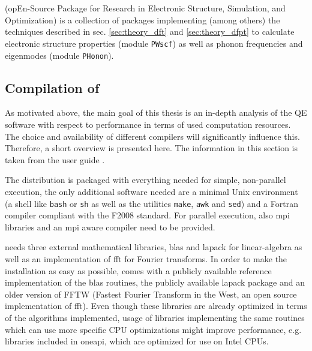 \documentclass[main.tex]{subfiles}
\begin{document}
\section{\QE}\label{sec:qe}

\QE (opEn-Source Package for Research in Electronic Structure, Simulation, and Optimization) \cite{giannozzi_quantum_2009,giannozzi_advanced_2017} is a collection of packages implementing (among others) the techniques described in sec. \ref{sec:theory_dft} and \ref{sec:theory_dfpt} to calculate electronic structure properties (module \texttt{PWscf}) as well as phonon frequencies and eigenmodes (module \texttt{PHonon}).

\subsection{Compilation of \QE}\label{sub:qe_compilation}

As motivated above, the main goal of this thesis is an in-depth analysis of the QE software with respect to performance in terms of used computation resources.
The choice and availability of different compilers will significantly influence this.
Therefore, a short overview is presented here.
The information in this section is taken from the  user guide \cite{noauthor_quantum_nodate}.

The \QE distribution is packaged with everything needed for simple, non-parallel execution, the only additional software needed are a minimal Unix environment (a shell like \texttt{bash} or \texttt{sh} as well as the utilities \texttt{make}, \texttt{awk} and \texttt{sed}) and a Fortran compiler compliant with the F2008 standard.
For parallel execution, also \gls{mpi} libraries and an \gls{mpi} aware compiler need to be provided.

\QE needs three external mathematical libraries, \gls{blas} and \gls{lapack} for linear-algebra as well as an implementation of \gls{fft} for Fourier transforms.
In order to make the installation as easy as possible, \QE comes with a publicly available reference implementation of the \gls{blas} routines, the publicly available \gls{lapack} package and an older version of FFTW (Fastest Fourier Transform in the West, an open source implementation of \gls{fft}).
Even though these libraries are already optimized in terms of the algorithms implemented, usage of libraries implementing the same routines which can use more specific CPU optimizations might improve performance, e.g. libraries included in \gls{oneapi}, which are optimized for use on Intel CPUs.
\end{document}
